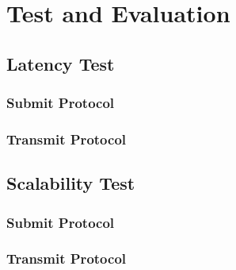\chapter{Test and Evaluation}
\section{Latency Test}
\subsection{Submit Protocol}
\subsection{Transmit Protocol}
\section{Scalability Test}
\subsection{Submit Protocol}
\subsection{Transmit Protocol}